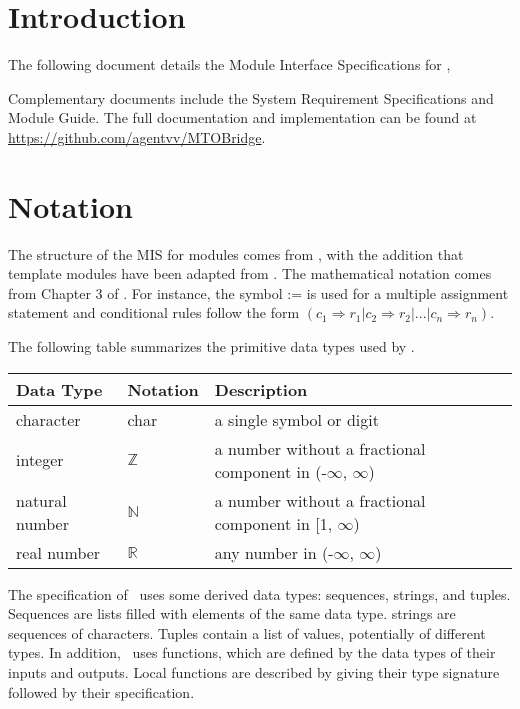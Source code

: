 \documentclass[12pt, titlepage]{article}
\begin{document}
\tableofcontents

\newpage


\section{Introduction}

The following document details the Module Interface Specifications for
\progname{}, 

Complementary documents include the System Requirement Specifications
and Module Guide.  The full documentation and implementation can be
found at \url{https://github.com/agentvv/MTOBridge}.

\section{Notation}

The structure of the MIS for modules comes from \citet{HoffmanAndStrooper1995},
with the addition that template modules have been adapted from
\cite{GhezziEtAl2003}.  The mathematical notation comes from Chapter 3 of
\citet{HoffmanAndStrooper1995}.  For instance, the symbol := is used for a
multiple assignment statement and conditional rules follow the form $(c_1
\Rightarrow r_1 | c_2 \Rightarrow r_2 | ... | c_n \Rightarrow r_n )$.

The following table summarizes the primitive data types used by \progname. 

\begin{center}
\renewcommand{\arraystretch}{1.2}
\noindent 
\begin{tabular}{l l p{7.5cm}} 
\toprule 
\textbf{Data Type} & \textbf{Notation} & \textbf{Description}\\ 
\midrule
character & char & a single symbol or digit\\
integer & $\mathbb{Z}$ & a number without a fractional component in (-$\infty$, $\infty$) \\
natural number & $\mathbb{N}$ & a number without a fractional component in [1, $\infty$) \\
real number & $\mathbb{R}$ & any number in (-$\infty$, $\infty$)\\
\bottomrule
\end{tabular} 
\end{center}

\noindent
The specification of \progname \ uses some derived data types: sequences, strings, and
tuples. Sequences are lists filled with elements of the same data type. strings
are sequences of characters. Tuples contain a list of values, potentially of
different types. In addition, \progname \ uses functions, which
are defined by the data types of their inputs and outputs. Local functions are
described by giving their type signature followed by their specification.
\end{document}
